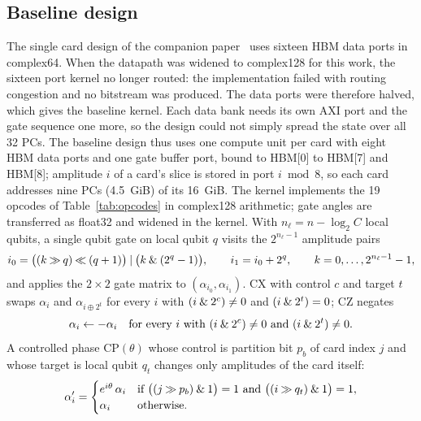 \subsection{Baseline design}\label{subsec:baseline-design}

The single card design of the companion paper~\cite{tiwari2026fpga30} uses sixteen HBM data ports in complex64. When the
datapath was widened to complex128 for this work, the sixteen port kernel no longer routed: the implementation failed
with routing congestion and no bitstream was produced. The data ports were therefore halved, which gives the baseline
kernel. Each data bank needs its own AXI port and the gate sequence one more, so the design could not simply
spread the state over all 32 PCs. The baseline design thus uses one compute unit per card with eight HBM data ports and one gate buffer port,
bound to HBM[0] to HBM[7] and HBM[8]; amplitude $i$ of a card's slice is stored in port $i \bmod 8$, so each card
addresses nine PCs (4.5~GiB) of its 16~GiB. The kernel implements the 19 opcodes of Table~\ref{tab:opcodes} in
complex128 arithmetic; gate angles are transferred as float32 and widened in the kernel. With $n_\ell = n - \log_2 C$
local qubits, a single qubit gate on local qubit $q$ visits the $2^{n_\ell-1}$ amplitude pairs
\begin{equation}
i_0 = \bigl((k \mathbin{\gg} q) \mathbin{\ll} (q+1)\bigr) \mathbin{|} \bigl(k \mathbin{\&} (2^q-1)\bigr), \qquad i_1 = i_0 + 2^q,
\qquad k = 0,\dots,2^{n_\ell-1}-1, \label{eq:pair}
\end{equation}
and applies the $2\times2$ gate matrix to $(\alpha_{i_0}, \alpha_{i_1})$. CX with control $c$ and target $t$ swaps
$\alpha_i$ and $\alpha_{i \oplus 2^t}$ for every $i$ with $(i \mathbin{\&} 2^c) \ne 0$ and $(i \mathbin{\&} 2^t) = 0$; CZ negates
\begin{equation}
\alpha_i \leftarrow -\alpha_i \quad \text{for every } i \text{ with } (i \mathbin{\&} 2^c) \ne 0 \text{ and } (i \mathbin{\&} 2^t) \ne 0.
\label{eq:cz}
\end{equation}
A controlled phase $\mathrm{CP}(\theta)$ whose control is partition bit $p_b$ of card index $j$ and whose target is
local qubit $q_t$ changes only amplitudes of the card itself:
\begin{equation}
\alpha_i' = \begin{cases} e^{i\theta}\,\alpha_i & \text{if } \bigl((j \mathbin{\gg} p_b) \mathbin{\&} 1\bigr) = 1 \text{ and }
\bigl((i \mathbin{\gg} q_t) \mathbin{\&} 1\bigr) = 1,\\ \alpha_i & \text{otherwise.}\end{cases} \label{eq:diag}
\end{equation}

